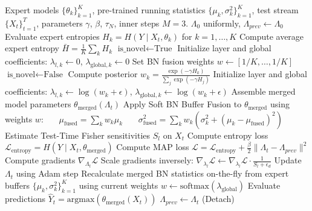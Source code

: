 \documentclass{article}
\theoremstyle{plain}
\theoremstyle{definition}
\theoremstyle{remark}
\begin{document}
\begin{algorithm}[H]
\caption{DF-Bayes-TTMM: Data-Free Bayesian Test-Time Model Merging}
\label{alg:df_bayes_ttmm}
\begin{footnotesize}
\begin{algorithmic}[1]
 Expert models $\{\theta_k\}_{k=1}^K$, pre-trained running statistics
$\{\mu_k, \sigma^2_k\}_{k=1}^K$, test stream $\{X_t\}_{t=1}^T$, parameters $\gamma$, $\beta$,
$\tau_N$, inner steps $M=3$.
 $\Lambda_0$ uniformly, $\Lambda_{prev} \leftarrow \Lambda_0$
    \STATE Evaluate expert entropies $H_k = H(Y \mid X_t, \theta_k)$ for $k=1,\dots,K$
    \STATE Compute average expert entropy $\bar{H} = \frac{1}{K}\sum_k H_k$
        \STATE $\text{is\_novel} \leftarrow \text{True}$
\STATE Initialize layer and global coefficients: $\lambda_{l,k} \leftarrow 0$,
$\lambda_{\text{global}, k} \leftarrow 0$
        \STATE Set BN fusion weights $w \leftarrow [1/K, \dots, 1/K]$
    \ELSE
        \STATE $\text{is\_novel} \leftarrow \text{False}$
        \STATE Compute posterior $w_k = \frac{\exp(-\gamma H_k)}{\sum_j \exp(-\gamma H_j)}$
\STATE Initialize layer and global coefficients: $\lambda_{l,k} \leftarrow \log(w_k + \epsilon)$,
$\lambda_{\text{global}, k} \leftarrow \log(w_k + \epsilon)$
    \ENDIF
    \STATE Assemble merged model parameters $\theta_{\text{merged}}(\Lambda_t)$
    \STATE Apply Soft BN Buffer Fusion to $\theta_{\text{merged}}$ using weights $w$:
    \STATE ~~~$\mu_{\text{fused}} = \sum_k w_k \mu_k$
    \STATE ~~~$\sigma^2_{\text{fused}} = \sum_k w_k (\sigma^2_k + (\mu_k - \mu_{\text{fused}})^2)$
    \STATE Estimate Test-Time Fisher sensitivities $S_l$ on $X_t$
\STATE Compute entropy loss $\mathcal{L}_{\text{entropy}} = H(Y \mid X_t, \theta_{\text{merged}})$
\STATE Compute MAP loss $\mathcal{L} = \mathcal{L}_{\text{entropy}} + \frac{\beta}{2}\|\Lambda_t -
\Lambda_{prev}\|^2$
        \STATE Compute gradients $\nabla_{\Lambda_t} \mathcal{L}$
\STATE Scale gradients inversely: $\nabla_{\lambda_l}\mathcal{L} \leftarrow
\nabla_{\lambda_l}\mathcal{L} \cdot \frac{1}{S_l + \epsilon_d}$
        \STATE Update $\Lambda_t$ using Adam step
\STATE Recalculate merged BN statistics on-the-fly from expert buffers $\{\mu_k,
\sigma^2_k\}_{k=1}^K$ using current weights $w \leftarrow \text{softmax}(\lambda_{\text{global}})$
    \ENDFOR
    \STATE Evaluate predictions $\hat{Y}_t = \text{argmax}(\theta_{\text{merged}}(X_t))$
    \STATE $\Lambda_{prev} \leftarrow \Lambda_t$ (Detach)
\ENDFOR
\end{algorithmic}
\end{footnotesize}
\end{algorithm}
\end{document}
